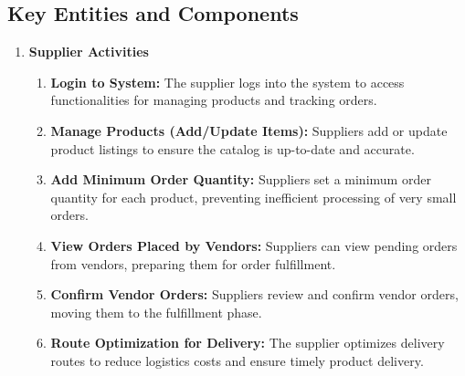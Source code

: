 \subsection{Key Entities and Components}
 \begin{enumerate}
    \item \textbf{Supplier Activities}
    \begin{enumerate}
        \item \textbf{Login to System:} The supplier logs into the system to access functionalities for managing products and tracking orders.
        \item \textbf{Manage Products (Add/Update Items):} Suppliers add or update product listings to ensure the catalog is up-to-date and accurate.
        \item \textbf{Add Minimum Order Quantity:} Suppliers set a minimum order quantity for each product, preventing inefficient processing of very small orders.
        \item \textbf{View Orders Placed by Vendors:} Suppliers can view pending orders from vendors, preparing them for order fulfillment.
        \item \textbf{Confirm Vendor Orders:} Suppliers review and confirm vendor orders, moving them to the fulfillment phase.
        \item \textbf{Route Optimization for Delivery:} The supplier optimizes delivery routes to reduce logistics costs and ensure timely product delivery.
    \end{enumerate}


\end{enumerate}
